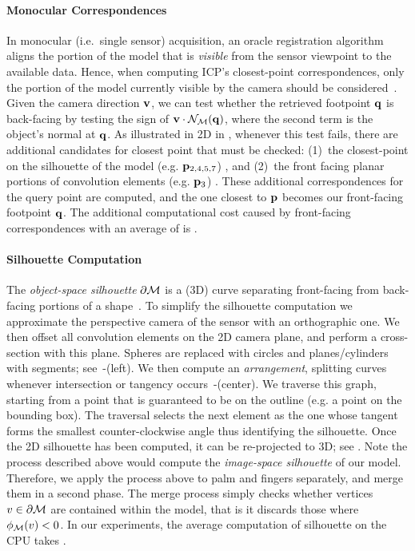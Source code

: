 \paragraph{Monocular Correspondences}
In monocular (i.e.\ single sensor) acquisition, an oracle registration algorithm aligns the portion of the model that is \emph{visible} from the sensor viewpoint to the available data. Hence, when computing ICP's closest-point correspondences, only the portion of the model currently visible by the camera should be considered~\cite{tagliasacchi2015robust}. Given the camera direction $\mathbf{v}$, we can test whether the retrieved footpoint $\mathbf{q}$ is back-facing by testing the sign of $\mathbf{v} \cdot \mathcal{N}_{\mathcal{M}}(\mathbf{q})$, where the second term is the object's normal at $\mathbf{q}$. As illustrated in 2D in , whenever this test fails, there are additional candidates for closest point that must be checked: (1)~the closest-point on the silhouette of the model (e.g. $\mathbf{p}_{2,4,5,7}$) , and (2)~the front facing planar portions of convolution elements (e.g. $\mathbf{p}_{3}$) . These additional correspondences for the query point are computed, and the one closest to $\mathbf{p}$ becomes our front-facing footpoint $\mathbf{q}$. The additional computational cost caused by front-facing correspondences with an average of  is .


\paragraph{Silhouette Computation}
The \emph{object-space silhouette} $\partial \mathcal{M}$ is a (3D) curve separating front-facing from back-facing portions of a shape~\cite[Sec.1]{olson2006eg}. To simplify the silhouette computation we approximate the perspective camera of the sensor with an orthographic one. We then offset all convolution elements on the 2D camera plane, and perform a cross-section with this plane. Spheres are replaced with circles and planes/cylinders with segments; see~-(left). We then compute an \emph{arrangement}, splitting curves whenever intersection or tangency occurs~-(center). We traverse this graph, starting from a point that is guaranteed to be on the outline (e.g. a point on the bounding box). The traversal selects the next element as the one whose tangent forms the smallest counter-clockwise angle thus identifying the silhouette. Once the 2D silhouette has been computed, it can be re-projected to 3D; see . Note the process described above would compute the \emph{image-space silhouette} of our model. Therefore, we apply the process above to palm and fingers separately, and merge them in a second phase.  The merge process simply checks whether vertices $v \in \partial \mathcal{M}$ are contained within the model, that is it discards those where $\phi_{\mathcal{M}}(v)<0$. In our experiments, the average computation of silhouette on the CPU takes .


